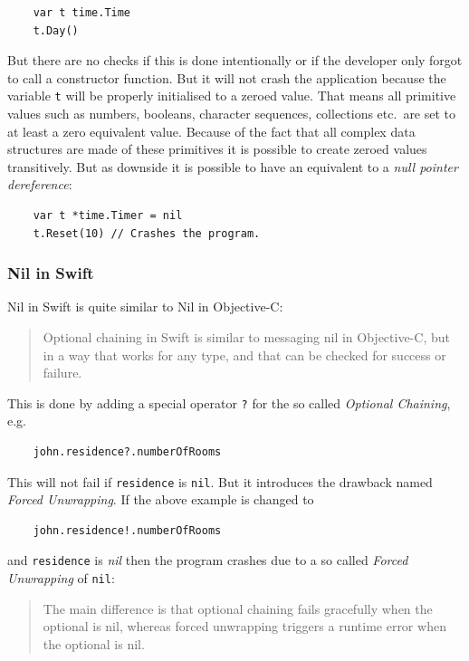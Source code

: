 \documentclass[11pt, a4paper]{report}
\begin{document}
\begin{lstlisting}
    var t time.Time
    t.Day()
\end{lstlisting}

But there are no checks if this is done intentionally or if the developer only forgot to call a constructor function. But it will not crash the application because the variable \texttt{t} will be properly initialised to a zeroed value. That means all primitive values such as numbers, booleans, character sequences, collections etc.\ are set to at least a zero equivalent value. Because of the fact that all complex data structures are made of these primitives it is possible to create zeroed values transitively. But as downside it is possible to have an equivalent to a \textit{null pointer dereference}:

\begin{lstlisting}
    var t *time.Timer = nil
    t.Reset(10) // Crashes the program.
\end{lstlisting}

\subsubsection{Nil in Swift}

Nil in Swift is quite similar to Nil in Objective-C:\@

\begin{quotation}
    Optional chaining in Swift is similar to messaging nil in Objective-C, but in a way that works for any type, and that can be checked for success or failure.\cite{swift-spec-optional-chaining}
\end{quotation}

This is done by adding a special operator \texttt{?} for the so called \textit{Optional Chaining}, e.g.

\begin{lstlisting}
    john.residence?.numberOfRooms
\end{lstlisting}

This will not fail if \texttt{residence} is \texttt{nil}. But it introduces the drawback named \textit{Forced Unwrapping}. If the above example is changed to

\begin{lstlisting}
    john.residence!.numberOfRooms
\end{lstlisting}
 and \texttt{residence} is \textit{nil} then the program crashes due to a so called \textit{Forced Unwrapping} of \texttt{nil}:

\begin{quotation}
    The main difference is that optional chaining fails gracefully when the optional is nil, whereas forced unwrapping triggers a runtime error when the optional is nil.\cite{swift-spec-optional-chaining}
\end{quotation}
\end{document}
